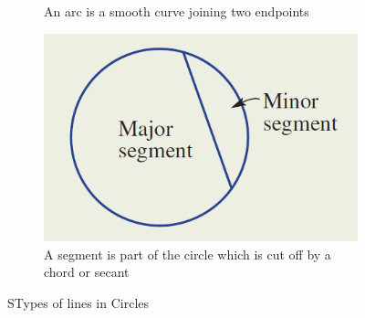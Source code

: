 \documentclass{report}
\begin{document}
\begin{figure}
\begin{subfigure}[b]{0.3\textwidth}
        \caption{An arc is a smooth curve joining two endpoints}
        \label{ARC}
    \end{subfigure}
    \hfill
    \begin{subfigure}[b]{0.3\textwidth}
        \centering
        \includegraphics[width=\textwidth]{segment.png}
        \caption{A segment is part of the circle which is cut off by a chord or secant}
        \label{Segment}
    \end{subfigure}
       \caption{STypes of lines in Circles}
       \label{fig:three circles}
\end{figure}
\end{document}
